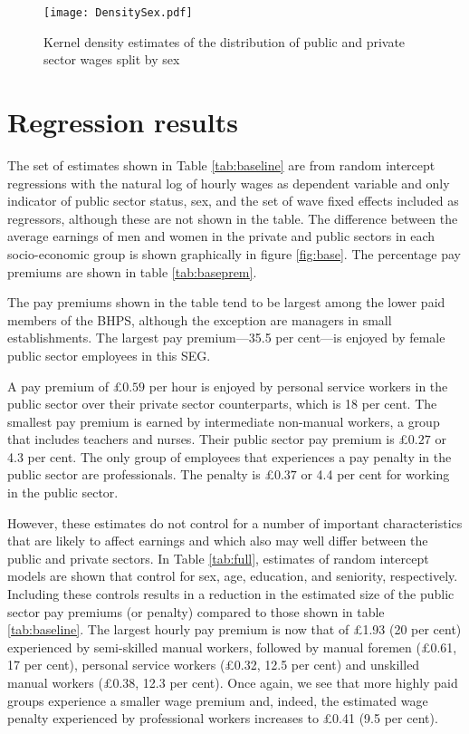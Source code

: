 \documentclass[a4paper,11pt,titlepage]{article}
\begin{document}
\begin{figure}[tb]
    \centering
    \texttt{[image: DensitySex.pdf]}
    \caption{Kernel density estimates of the distribution of public and private sector wages split by sex\label{fig:densitysex}}
\end{figure}

\section{Regression results}
The set of estimates shown in Table \ref{tab:baseline} are from random intercept regressions with the natural log of hourly wages as dependent variable and only indicator of public sector status, sex, and the set of wave fixed effects included as regressors, although these are not shown in the table.  The difference between the average earnings of men and women in the private and public sectors in each socio-economic group is shown graphically in figure \ref{fig:base}. The percentage pay premiums are shown in table \ref{tab:baseprem}.

The pay premiums shown in the table tend to be largest among the lower paid
members of the BHPS, although the exception are managers in small establishments. The largest pay premium---35.5 per cent---is enjoyed by female public sector employees in this SEG.

 A pay premium of \pounds $0.59$ per hour is enjoyed by personal service workers in the public sector over their private sector counterparts,
which is 18 per cent. The smallest pay premium is earned by intermediate non-manual
workers, a group that includes teachers and nurses. Their public sector pay premium
is \pounds $0.27$ or 4.3 per cent. The only group of employees that experiences a pay penalty in
the public sector are professionals. The penalty is \pounds $0.37$ or 4.4 per cent for working in
the public sector.

However, these estimates do not control for a number of important characteristics
that are likely to affect earnings and which also may well differ between the public and
private sectors. In Table \ref{tab:full}, estimates of random intercept models are shown that control
for sex, age, education, and seniority, respectively. Including these controls results in a reduction in the estimated size of the public sector pay premiums (or penalty) compared to those shown in table \ref{tab:baseline}.  The largest hourly pay premium is now that of \pounds 1.93 (20
per cent) experienced by semi-skilled manual workers, followed by manual foremen
(\pounds 0.61, 17 per cent), personal service workers (\pounds 0.32, 12.5 per cent) and unskilled manual
workers (\pounds 0.38, 12.3 per cent). Once again, we see that more highly paid groups experience a smaller wage premium and, indeed, the estimated wage penalty experienced by professional workers increases to \pounds 0.41 (9.5 per cent).
\end{document}
